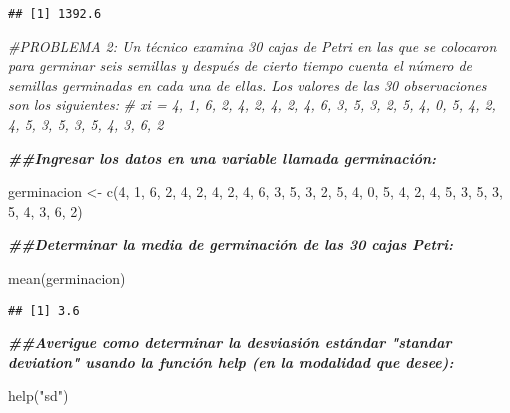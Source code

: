 \documentclass[
]{article}
\newenvironment{Shaded}{\begin{snugshade}}{\end{snugshade}}
\newcommand{\CommentTok}[1]{\textcolor[rgb]{0.56,0.35,0.01}{\textit{#1}}}
\newcommand{\DecValTok}[1]{\textcolor[rgb]{0.00,0.00,0.81}{#1}}
\newcommand{\DocumentationTok}[1]{\textcolor[rgb]{0.56,0.35,0.01}{\textbf{\textit{#1}}}}
\newcommand{\FunctionTok}[1]{\textcolor[rgb]{0.00,0.00,0.00}{#1}}
\newcommand{\NormalTok}[1]{#1}
\newcommand{\OtherTok}[1]{\textcolor[rgb]{0.56,0.35,0.01}{#1}}
\newcommand{\StringTok}[1]{\textcolor[rgb]{0.31,0.60,0.02}{#1}}
\begin{document}
\begin{verbatim}
## [1] 1392.6
\end{verbatim}

\begin{Shaded}
\begin{Highlighting}[]
\CommentTok{\#PROBLEMA 2: Un técnico examina 30 cajas de Petri en las que se colocaron para germinar seis semillas y después de cierto tiempo cuenta el número de semillas germinadas en cada una de ellas. Los valores de las 30 observaciones son los siguientes:}
\CommentTok{\# xi = 4, 1, 6, 2, 4, 2, 4, 2, 4, 6, 3, 5, 3, 2, 5, 4, 0, 5, 4, 2, 4, 5, 3, 5, 3, 5, 4, 3, 6, 2}

\DocumentationTok{\#\#Ingresar los datos en una variable llamada germinación:}

\NormalTok{germinacion }\OtherTok{\textless{}{-}} \FunctionTok{c}\NormalTok{(}\DecValTok{4}\NormalTok{, }\DecValTok{1}\NormalTok{, }\DecValTok{6}\NormalTok{, }\DecValTok{2}\NormalTok{, }\DecValTok{4}\NormalTok{, }\DecValTok{2}\NormalTok{, }\DecValTok{4}\NormalTok{, }\DecValTok{2}\NormalTok{, }\DecValTok{4}\NormalTok{, }\DecValTok{6}\NormalTok{, }\DecValTok{3}\NormalTok{, }\DecValTok{5}\NormalTok{, }\DecValTok{3}\NormalTok{, }\DecValTok{2}\NormalTok{, }\DecValTok{5}\NormalTok{, }\DecValTok{4}\NormalTok{, }\DecValTok{0}\NormalTok{, }\DecValTok{5}\NormalTok{, }\DecValTok{4}\NormalTok{, }\DecValTok{2}\NormalTok{, }\DecValTok{4}\NormalTok{, }\DecValTok{5}\NormalTok{, }\DecValTok{3}\NormalTok{, }\DecValTok{5}\NormalTok{, }\DecValTok{3}\NormalTok{, }\DecValTok{5}\NormalTok{, }\DecValTok{4}\NormalTok{, }\DecValTok{3}\NormalTok{, }\DecValTok{6}\NormalTok{, }\DecValTok{2}\NormalTok{)}

\DocumentationTok{\#\#Determinar la media de germinación de las 30 cajas Petri:}

\FunctionTok{mean}\NormalTok{(germinacion)}
\end{Highlighting}
\end{Shaded}

\begin{verbatim}
## [1] 3.6
\end{verbatim}

\begin{Shaded}
\begin{Highlighting}[]
\DocumentationTok{\#\#Averigue como determinar la desviasión estándar "standar deviation" usando la función help (en la modalidad que desee):}

\FunctionTok{help}\NormalTok{(}\StringTok{"sd"}\NormalTok{)}
\end{Highlighting}
\end{Shaded}
\end{document}
